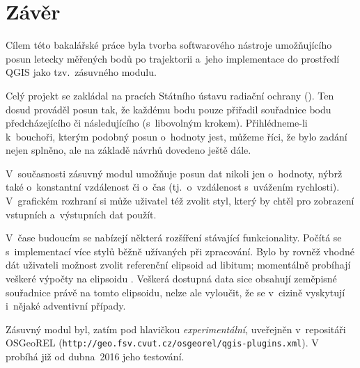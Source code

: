 \chapter{Závěr}
\label{zaver}

Cílem této bakalářské práce byla tvorba
softwarového nástroje umožňujícího posun letecky
měřených bodů po trajektorii a~jeho implementace
do prostředí QGIS jako tzv.~zásuvného modulu. 

Celý projekt se zakládal na pracích Státního
ústavu radiační ochrany (). Ten dosud prováděl posun
tak, že každému bodu pouze přiřadil souřadnice bodu
předcházejícího či následujícího (s~libovolným
krokem). Přihlédneme-li k~bouchoři, kterým podobný posun
o~hodnoty jest, můžeme říci, že bylo zadání
nejen splněno, ale na základě návrhů 
dovedeno ještě dále. 

V~současnosti zásuvný modul umožňuje posun dat
nikoli jen o~hodnoty, nýbrž také o~konstantní
vzdálenost či o~čas (tj.~o~vzdálenost
s~uvážením rychlosti). V~grafic\-kém
rozhraní si může uživatel též zvolit styl,
který by chtěl pro zobrazení vstupních
a~výstupních dat použít. 

V~čase budoucím se nabízejí některá rozšíření
stávající funkcionality. Počítá se s~implementací
více stylů běžně užívaných při zpracování. Bylo by
rovněž vhodné dát uživateli možnost zvolit
referenční elipsoid ad libitum; momentálně
probíhají veš\-keré výpočty na elipsoidu .
Veškerá dostupná data sice obsahují zeměpisné souřadnice
právě na tomto elipsoidu, nelze ale vyloučit, že
se v~cizině vyskytují i~nějaké adventivní případy.

Zásuvný modul byl, zatím pod hlavičkou \textit{experimentální},
uveřejněn v~repositáři OSGeoREL ({\tt http://geo.fsv.cvut.cz/osgeorel/qgis-plugins.xml}). V~ probíhá již od dubna~2016 jeho testování.


